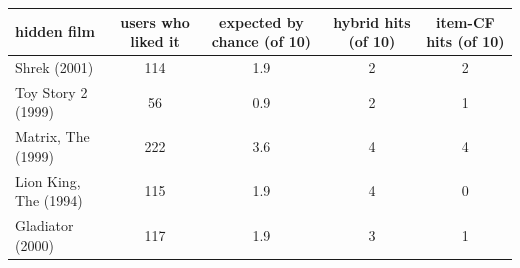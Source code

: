 \begin{tabular}{lcccc}
\toprule
hidden film & users who liked it & expected by chance (of 10) & hybrid hits (of 10) & item-CF hits (of 10) \\
\midrule
Shrek (2001) & 114 & 1.9 & 2 & 2 \\
Toy Story 2 (1999) & 56 & 0.9 & 2 & 1 \\
Matrix, The (1999) & 222 & 3.6 & 4 & 4 \\
Lion King, The (1994) & 115 & 1.9 & 4 & 0 \\
Gladiator (2000) & 117 & 1.9 & 3 & 1 \\
\bottomrule
\end{tabular}
